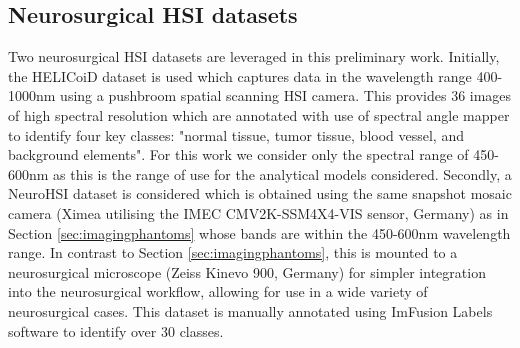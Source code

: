 \subsection{Neurosurgical HSI datasets}\label{sec:NeuroHSIdata}
Two neurosurgical HSI datasets are leveraged in this preliminary work. Initially, the HELICoiD dataset is used which captures data in the wavelength range 400-1000nm using a pushbroom spatial scanning HSI camera\cite{Fabelo2019}. This provides 36 images of high spectral resolution which are annotated with use of spectral angle mapper to identify four key classes: "normal tissue, tumor tissue, blood vessel, and background elements". For this work we consider only the spectral range of 450-600nm as this is the range of use for the analytical models considered. Secondly, a NeuroHSI dataset is considered which is obtained using the same snapshot mosaic camera (Ximea utilising the IMEC CMV2K-SSM4X4-VIS sensor, Germany) as in Section \ref{sec:imagingphantoms} whose bands are within the 450-600nm wavelength range. In contrast to Section \ref{sec:imagingphantoms}, this is mounted to a neurosurgical microscope (Zeiss Kinevo 900, Germany) for simpler integration into the neurosurgical workflow, allowing for use in a wide variety of neurosurgical cases. This dataset is manually annotated using ImFusion Labels software to identify over 30 classes.

